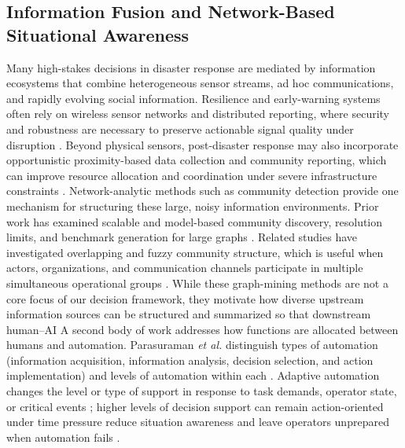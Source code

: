 \documentclass[journal]{IEEEtran}
\theoremstyle{plain}
\theoremstyle{definition}
\providecommand{\DIFaddtex}[1]{{\protect\color{blue} \sf #1}} %
\providecommand{\DIFdeltex}[1]{{\protect\color{red} \scriptsize #1}} %
\providecommand{\DIFaddbegin}{} %
\providecommand{\DIFaddend}{} %
\providecommand{\DIFdelbegin}{} %
\providecommand{\DIFdelend}{} %
\providecommand{\DIFadd}[1]{\texorpdfstring{\DIFaddtex{#1}}{#1}} %
\providecommand{\DIFdel}[1]{\texorpdfstring{\DIFdeltex{#1}}{}} %
\newcommand{\DIFscaledelfig}{0.5}
\newlength{\DIFdelgraphicswidth} %
\newlength{\DIFdelgraphicsheight} %
\newcommand{\DIFaddincludegraphics}[2][]{{\color{blue}\fbox{\DIFOincludegraphics[#1]{#2}}}} %
\newcommand{\DIFdelincludegraphics}[2][]{%
\sbox{\DIFdelgraphicsbox}{\DIFOincludegraphics[#1]{#2}}%
\settoboxwidth{\DIFdelgraphicswidth}{\DIFdelgraphicsbox} %
\settoboxtotalheight{\DIFdelgraphicsheight}{\DIFdelgraphicsbox} %
\scalebox{\DIFscaledelfig}{%
\parbox[b]{\DIFdelgraphicswidth}{\usebox{\DIFdelgraphicsbox}\\[-\baselineskip] \rule{\DIFdelgraphicswidth}{0em}}\llap{\resizebox{\DIFdelgraphicswidth}{\DIFdelgraphicsheight}{%
\setlength{\unitlength}{\DIFdelgraphicswidth}%
\begin{picture}(1,1)%
\thicklines\linethickness{2pt} %
{\color[rgb]{1,0,0}\put(0,0){\framebox(1,1){}}}%
{\color[rgb]{1,0,0}\put(0,0){\line( 1,1){1}}}%
{\color[rgb]{1,0,0}\put(0,1){\line(1,-1){1}}}%
\end{picture}%
}\hspace*{3pt}}} %
} %
\DeclareRobustCommand{\DIFaddbegin}{\DIFOaddbegin \let\includegraphics\DIFaddincludegraphics} %
\DeclareRobustCommand{\DIFaddend}{\DIFOaddend \let\includegraphics\DIFOincludegraphics} %
\DeclareRobustCommand{\DIFdelbegin}{\DIFOdelbegin \let\includegraphics\DIFdelincludegraphics} %
\DeclareRobustCommand{\DIFdelend}{\DIFOaddend \let\includegraphics\DIFOincludegraphics} %
\begin{document}
\DIFdelbegin \subsection{\DIFdel{Information Fusion and Network-Based Situational Awareness}}
\addtocounter{subsection}{-1}%
\DIFdel{Many high-stakes decisions in disaster response are mediated by information ecosystems that combine heterogeneous sensor streams, ad hoc communications, and rapidly evolving social information.
Resilience and early-warning systems often rely on wireless sensor networks and distributed reporting, where security and robustness are necessary to preserve actionable signal quality under disruption \cite{Yang2005MobiHoc}. Beyond physical sensors, post-disaster response may also incorporate opportunistic proximity-based data collection and community reporting, which can improve resource allocation and coordination under severe infrastructure constraints \cite{Longo2025PMC,Stephens2022SIGDOC}. Network-analytic methods such as community detection provide one mechanism for structuring these large, noisy information environments. Prior work has examined scalable and model-based community discovery, resolution limits, and benchmark generation for large graphs \cite{Wakita2007WWW,Prokhorenkova2019WWW,Xian2025WWW,Slota2019SC,Sun2014FSKD,Rezaei2015ASONAM,Akhter2022ICCA}. Related studies have investigated overlapping and fuzzy community structure, which is useful when actors, organizations, and communication channels participate in multiple simultaneous operational groups \cite{Sun2011InformationSciences,Havens2013TFUZZ,Vehlow2013TVCG,Zhang2012KDD,Cao2020ICIIP,Li2022AppliedIntelligence}. While these graph-mining methods are not a core focus of our decision framework, they motivate how diverse upstream information sources can be structured and summarized so that downstream human--AI }\DIFdelend \DIFaddbegin \DIFadd{A second body of work addresses how functions are allocated between humans and automation. Parasuraman \emph{et al.} distinguish types of automation (information acquisition, information analysis, decision selection, and action implementation) and levels of automation within each \cite{Parasuraman2000LOA}. Adaptive automation changes the level or type of support in response to task demands, operator state, or critical events \cite{Scerbo2007,Kaber2004}; higher levels of }\DIFaddend decision support can \DIFdelbegin \DIFdel{remain action-oriented under time pressure \cite{Duan2014KDD}}\DIFdelend \DIFaddbegin \DIFadd{reduce situation awareness and leave operators unprepared when automation fails \cite{Kaber2004,Parasuraman2010}}\DIFaddend .
\end{document}
